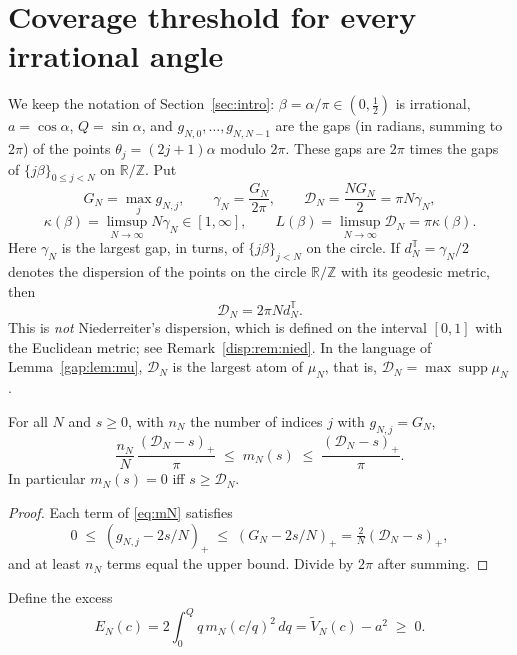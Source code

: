 \section{Coverage threshold for every irrational angle}\label{disp:sec}

We keep the notation of Section~\ref{sec:intro}: $\beta=\alpha/\pi\in(0,\tfrac12)$ is irrational, $a=\cos\alpha$, $Q=\sin\alpha$, and
$g_{N,0},\dots,g_{N,N-1}$ are the gaps (in radians, summing to $2\pi$) of the points $\theta_j=(2j+1)\alpha$ modulo $2\pi$.
These gaps are $2\pi$ times the gaps of $\{j\beta\}_{0\le j<N}$ on $\mathbb R/\mathbb Z$.
Put
\[
G_N=\max_j g_{N,j},\qquad \gamma_N=\frac{G_N}{2\pi},\qquad \mathcal D_N=\frac{N G_N}{2}=\pi N \gamma_N ,
\]
\[
\kappa(\beta)=\limsup_{N\to\infty}N \gamma_N\in[1,\infty],\qquad L(\beta)=\limsup_{N\to\infty}\mathcal D_N=\pi\kappa(\beta).
\]
Here $\gamma_N$ is the largest gap, in turns, of $\{j\beta\}_{j<N}$ on the circle. If $d^{\mathbb T}_N=\gamma_N/2$ denotes the
dispersion of the points on the circle $\mathbb R/\mathbb Z$ with its geodesic metric, then
\[
\mathcal D_N=2\pi N d^{\mathbb T}_N .
\]
This is \emph{not} Niederreiter's dispersion, which is defined on the interval $[0,1]$ with the Euclidean metric;
see Remark~\ref{disp:rem:nied}.
In the language of Lemma~\ref{gap:lem:mu}, $\mathcal D_N$ is the largest atom of $\mu_N$, that is, $\mathcal D_N=\max\operatorname{supp}\mu_N$.

\begin{lemma}\label{disp:lem:mass}
For all $N$ and $s\ge0$, with $n_N$ the number of indices $j$ with $g_{N,j}=G_N$,
\[
\frac{n_N}{N}\,\frac{(\mathcal D_N-s)_+}{\pi}\;\le\; m_N(s)\;\le\;\frac{(\mathcal D_N-s)_+}{\pi}.
\]
In particular $m_N(s)=0$ iff $s\ge \mathcal D_N$.
\end{lemma}
\begin{proof}
Each term of \eqref{eq:mN} satisfies
\[
0\;\le\;(g_{N,j}-2s/N)_+\;\le\;(G_N-2s/N)_+=\tfrac2N(\mathcal D_N-s)_+ ,
\]
and at least $n_N$ terms equal the upper bound. Divide by $2\pi$ after summing.
\end{proof}

Define the excess
\begin{equation}\label{disp:eq:EN}
E_N(c)=2\int_0^Q q\,m_N(c/q)^2\,dq=\widetilde V_N(c)-a^2\;\ge\;0 .
\end{equation}

